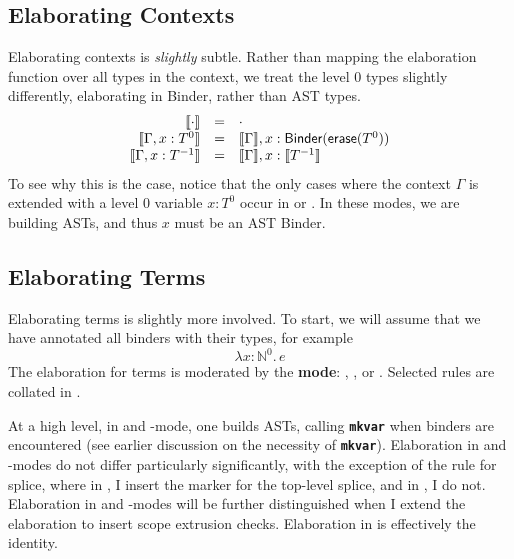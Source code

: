 \subsection{Elaborating Contexts}
Elaborating contexts is \textit{slightly} subtle. Rather than mapping the elaboration function over all types in the context, we treat the level $0$ types slightly differently, elaborating in \textsf{Binder}, rather than \textsf{AST} types. 
\[
\begin{array}{rcl}
  \llbracket \cdot \rrbracket & = & \cdot \\
  \llbracket \Gamma, x:T^0 \rrbracket & = & \llbracket \Gamma \rrbracket, x: \textsf{Binder}(\textsf{erase}(T^0))\\
  \llbracket \Gamma, x:T^{-1} \rrbracket & = & \llbracket \Gamma \rrbracket, x: \llbracket T^{-1} \rrbracket
\end{array}
\]
To see why this is the case, notice that the only cases where the context $\Gamma$ is extended with a level $0$ variable $x: T^0$ occur in \compilemode{} or \quotemode{}. In these modes, we are building ASTs, and thus $x$ must be an AST \textsf{Binder}. 

\subsection{Elaborating Terms}
Elaborating terms is slightly more involved. To start, we will assume that we have annotated all binders with their types, for example 
\[\lambda x: \mathbb{N}^0. \, e\]
The elaboration for terms is moderated by the \textbf{mode}: \compilemode{}, \quotemode{}, or \splicemode{}. Selected rules are collated in . 

At a high level, in \compilemode{} and \quotemode{}-mode, one builds ASTs, calling \textbf{\texttt{mkvar}} when binders are encountered (see earlier discussion on the necessity of \textbf{\texttt{mkvar}}). Elaboration in \compilemode{} and \quotemode{}-modes do not differ particularly significantly, with the exception of the rule for splice, where in \compilemode{}, I insert the marker for the top-level splice, and in \quotemode{}, I do not. Elaboration in \compilemode{} and \quotemode{}-modes will be further distinguished when I extend the elaboration to insert scope extrusion checks. Elaboration in \splicemode{} is effectively the identity. 

